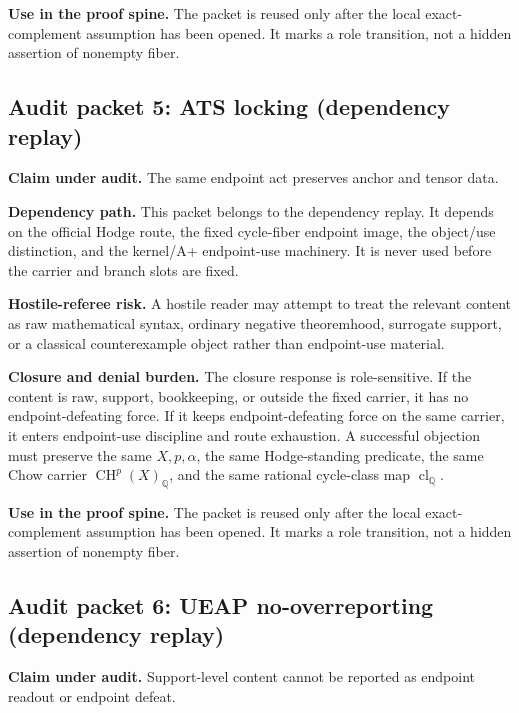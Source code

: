 \documentclass[11pt]{article}
\newcommand{\QQ}{\mathbb{Q}}
\newcommand{\CH}{\operatorname{CH}}
\newcommand{\clQ}{\operatorname{cl}_{\QQ}}
\begin{document}
\par\noindent\textbf{Use in the proof spine.} The packet is reused only after the local exact-complement assumption has been opened. It marks a role transition, not a hidden assertion of nonempty fiber.


\subsection{Audit packet 5: ATS locking (dependency replay)}


\par\noindent\textbf{Claim under audit.} The same endpoint act preserves anchor and tensor data.


\par\noindent\textbf{Dependency path.} This packet belongs to the dependency replay. It depends on the official Hodge route, the fixed cycle-fiber endpoint image, the object/use distinction, and the kernel/A+ endpoint-use machinery. It is never used before the carrier and branch slots are fixed.


\par\noindent\textbf{Hostile-referee risk.} A hostile reader may attempt to treat the relevant content as raw mathematical syntax, ordinary negative theoremhood, surrogate support, or a classical counterexample object rather than endpoint-use material.


\par\noindent\textbf{Closure and denial burden.} The closure response is role-sensitive. If the content is raw, support, bookkeeping, or outside the fixed carrier, it has no endpoint-defeating force. If it keeps endpoint-defeating force on the same carrier, it enters endpoint-use discipline and route exhaustion. A successful objection must preserve the same $X,p,\alpha$, the same Hodge-standing predicate, the same Chow carrier $\CH^p(X)_\QQ$, and the same rational cycle-class map $\clQ$.


\par\noindent\textbf{Use in the proof spine.} The packet is reused only after the local exact-complement assumption has been opened. It marks a role transition, not a hidden assertion of nonempty fiber.


\subsection{Audit packet 6: UEAP no-overreporting (dependency replay)}


\par\noindent\textbf{Claim under audit.} Support-level content cannot be reported as endpoint readout or endpoint defeat.
\end{document}
